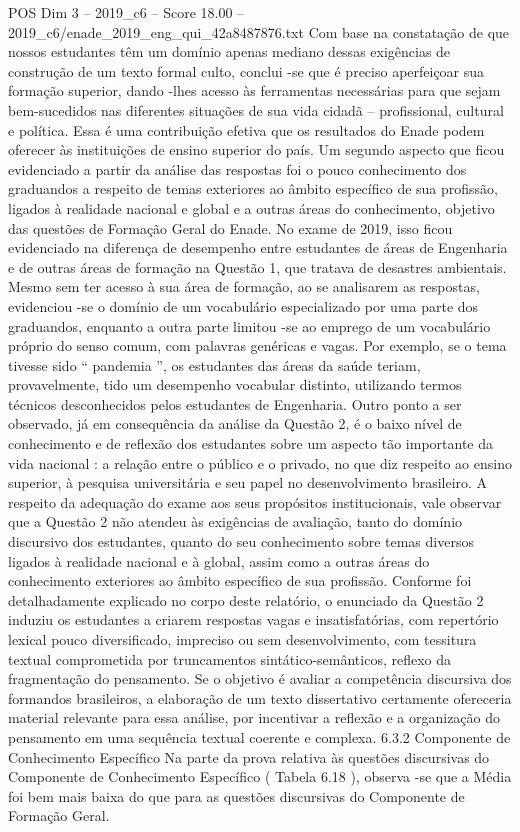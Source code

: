 \begin{textsample}{POS Dim 3 – 2019\_c6 – Score 18.00 – 2019\_c6/enade\_2019\_eng\_qui\_42a8487876.txt}
Com base na constatação de que nossos estudantes têm um domínio apenas mediano dessas exigências de construção de um texto formal culto, conclui -se que é preciso aperfeiçoar sua formação superior, dando -lhes acesso às ferramentas necessárias para que sejam bem-sucedidos nas diferentes situações de sua vida cidadã – profissional, cultural e política.
Essa é uma contribuição efetiva que os resultados do Enade podem oferecer às instituições de ensino superior do país.
Um segundo aspecto que ficou evidenciado a partir da análise das respostas foi o pouco conhecimento dos graduandos a respeito de temas exteriores ao âmbito específico de sua profissão, ligados à realidade nacional e global e a outras áreas do conhecimento, objetivo das questões de Formação Geral do Enade.
No exame de 2019, isso ficou evidenciado na diferença de desempenho entre estudantes de áreas de Engenharia e de outras áreas de formação na Questão 1, que tratava de desastres ambientais.
Mesmo sem ter acesso à sua área de formação, ao se analisarem as respostas, evidenciou -se o domínio de um vocabulário especializado por uma parte dos graduandos, enquanto a outra parte limitou -se ao emprego de um vocabulário próprio do senso comum, com palavras genéricas e vagas.
Por exemplo, se o tema tivesse sido “ pandemia ”, os estudantes das áreas da saúde teriam, provavelmente, tido um desempenho vocabular distinto, utilizando termos técnicos desconhecidos pelos estudantes de Engenharia.
Outro ponto a ser observado, já em consequência da análise da Questão 2, é o baixo nível de conhecimento e de reflexão dos estudantes sobre um aspecto tão importante da vida nacional : a relação entre o público e o privado, no que diz respeito ao ensino superior, à pesquisa universitária e seu papel no desenvolvimento brasileiro.
A respeito da adequação do exame aos seus propósitos institucionais, vale observar que a Questão 2 não atendeu às exigências de avaliação, tanto do domínio discursivo dos estudantes, quanto do seu conhecimento sobre temas diversos ligados à realidade nacional e à global, assim como a outras áreas do conhecimento exteriores ao âmbito específico de sua profissão.
Conforme foi detalhadamente explicado no corpo deste relatório, o enunciado da Questão 2 induziu os estudantes a criarem respostas vagas e insatisfatórias, com repertório lexical pouco diversificado, impreciso ou sem desenvolvimento, com tessitura textual comprometida por truncamentos sintático-semânticos, reflexo da fragmentação do pensamento.
Se o objetivo é avaliar a competência discursiva dos formandos brasileiros, a elaboração de um texto dissertativo certamente ofereceria material relevante para essa análise, por incentivar a reflexão e a organização do pensamento em uma sequência textual coerente e complexa. 6.3.2 Componente de Conhecimento Específico Na parte da prova relativa às questões discursivas do Componente de Conhecimento Específico ( Tabela 6.18 ), observa -se que a Média foi bem mais baixa do que para as questões discursivas do Componente de Formação Geral.

\end{textsample}
